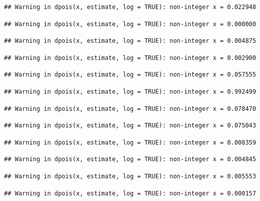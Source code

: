 \documentclass[]{article}
\begin{document}
\begin{verbatim}
## Warning in dpois(x, estimate, log = TRUE): non-integer x = 0.022948
\end{verbatim}

\begin{verbatim}
## Warning in dpois(x, estimate, log = TRUE): non-integer x = 0.000000
\end{verbatim}

\begin{verbatim}
## Warning in dpois(x, estimate, log = TRUE): non-integer x = 0.004875
\end{verbatim}

\begin{verbatim}
## Warning in dpois(x, estimate, log = TRUE): non-integer x = 0.002900
\end{verbatim}

\begin{verbatim}
## Warning in dpois(x, estimate, log = TRUE): non-integer x = 0.057555
\end{verbatim}

\begin{verbatim}
## Warning in dpois(x, estimate, log = TRUE): non-integer x = 0.992499
\end{verbatim}

\begin{verbatim}
## Warning in dpois(x, estimate, log = TRUE): non-integer x = 0.078470
\end{verbatim}

\begin{verbatim}
## Warning in dpois(x, estimate, log = TRUE): non-integer x = 0.075043
\end{verbatim}

\begin{verbatim}
## Warning in dpois(x, estimate, log = TRUE): non-integer x = 0.008359
\end{verbatim}

\begin{verbatim}
## Warning in dpois(x, estimate, log = TRUE): non-integer x = 0.004845
\end{verbatim}

\begin{verbatim}
## Warning in dpois(x, estimate, log = TRUE): non-integer x = 0.005553
\end{verbatim}

\begin{verbatim}
## Warning in dpois(x, estimate, log = TRUE): non-integer x = 0.000157
\end{verbatim}
\end{document}
